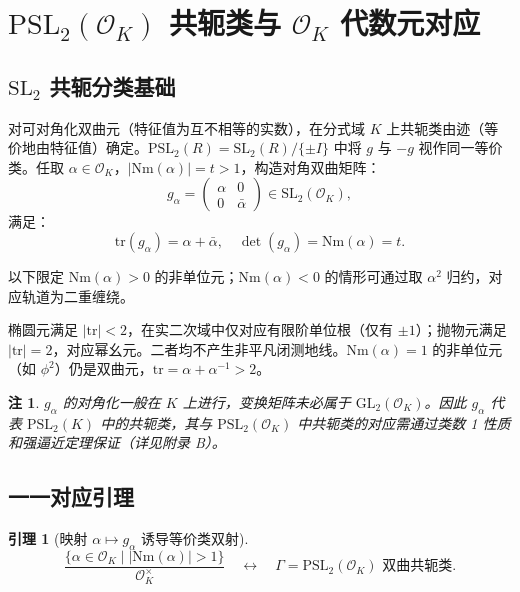 \documentclass[12pt,a4paper]{article}
\newtheorem{lemma}[theorem]{引理}
\newtheorem{remark}[theorem]{注}
\begin{document}
\section{$\mathrm{PSL}_2(\mathcal{O}_K)$ 共轭类与 $\mathcal{O}_K$ 代数元对应}

\subsection{$\mathrm{SL}_2$ 共轭分类基础}

对可对角化双曲元（特征值为互不相等的实数），在分式域 $K$ 上共轭类由迹（等价地由特征值）确定。$\mathrm{PSL}_2(R) = \mathrm{SL}_2(R)/\{\pm I\}$ 中将 $g$ 与 $-g$ 视作同一等价类。任取 $\alpha \in \mathcal{O}_K$，$|\mathrm{Nm}(\alpha)| = t > 1$，构造对角双曲矩阵：
\[
g_\alpha = \begin{pmatrix} \alpha & 0 \\ 0 & \bar{\alpha} \end{pmatrix} \in \mathrm{SL}_2(\mathcal{O}_K),
\]
满足：
\[
\mathrm{tr}(g_\alpha) = \alpha + \bar{\alpha}, \quad \det(g_\alpha) = \mathrm{Nm}(\alpha) = t.
\]

以下限定 $\mathrm{Nm}(\alpha) > 0$ 的非单位元；$\mathrm{Nm}(\alpha) < 0$ 的情形可通过取 $\alpha^2$ 归约，对应轨道为二重缠绕。

椭圆元满足 $|\mathrm{tr}| < 2$，在实二次域中仅对应有限阶单位根（仅有 $\pm 1$）；抛物元满足 $|\mathrm{tr}| = 2$，对应幂幺元。二者均不产生非平凡闭测地线。$\mathrm{Nm}(\alpha) = 1$ 的非单位元（如 $\phi^2$）仍是双曲元，$\mathrm{tr} = \alpha + \alpha^{-1} > 2$。

\begin{remark}
$g_\alpha$ 的对角化一般在 $K$ 上进行，变换矩阵未必属于 $\mathrm{GL}_2(\mathcal{O}_K)$。因此 $g_\alpha$ 代表 $\mathrm{PSL}_2(K)$ 中的共轭类，其与 $\mathrm{PSL}_2(\mathcal{O}_K)$ 中共轭类的对应需通过类数 1 性质和强逼近定理保证（详见附录 B）。
\end{remark}

\subsection{一一对应引理}

\begin{lemma}[映射 $\alpha \mapsto g_\alpha$ 诱导等价类双射]
\[
\frac{\{\alpha \in \mathcal{O}_K \mid |\mathrm{Nm}(\alpha)| > 1\}}{\mathcal{O}_K^\times} \quad \longleftrightarrow \quad \Gamma = \mathrm{PSL}_2(\mathcal{O}_K) \text{ 双曲共轭类}.
\]
\end{lemma}
\end{document}
